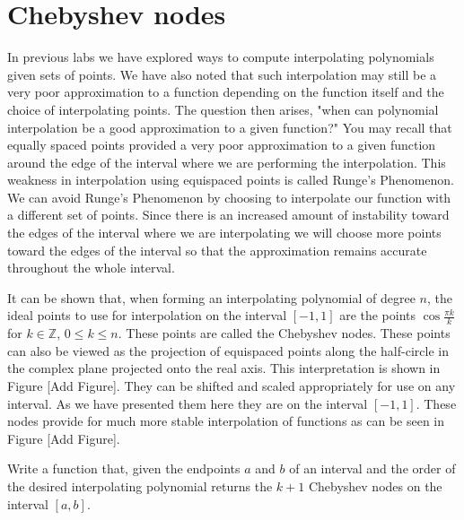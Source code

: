 \label{lab:cheb_interp}


\section*{Chebyshev nodes}

In previous labs we have explored ways to compute interpolating polynomials given sets of points.
We have also noted that such interpolation may still be a very poor approximation to a function depending on the function itself and the choice of interpolating points.
The question then arises, "when can polynomial interpolation be a good approximation to a given function?"
You may recall that equally spaced points provided a very poor approximation to a given function around the edge of the interval where we are performing the interpolation.
This weakness in interpolation using equispaced points is called Runge's Phenomenon.
We can avoid Runge's Phenomenon by choosing to interpolate our function with a different set of points.
Since there is an increased amount of instability toward the edges of the interval where we are interpolating we will choose more points toward the edges of the interval so that the approximation remains accurate throughout the whole interval.

It can be shown that, when forming an interpolating polynomial of degree $n$, the ideal points to use for interpolation on the interval $[-1, 1]$ are the points $\cos{\frac{\pi k}{k}}$ for $k\in\mathbb{Z}$, $0 \leq k \leq n$.
These points are called the Chebyshev nodes.
These points can also be viewed as the projection of equispaced points along the half-circle in the complex plane projected onto the real axis.
This interpretation is shown in Figure [Add Figure].
They can be shifted and scaled appropriately for use on any interval.
As we have presented them here they are on the interval $[-1, 1]$.
These nodes provide for much more stable interpolation of functions as can be seen in Figure [Add Figure].

\begin{problem}
Write a function that, given the endpoints $a$ and $b$ of an interval and the order of the desired interpolating polynomial returns the $k+1$ Chebyshev nodes on the interval $[ a, b ]$.
\end{problem}

